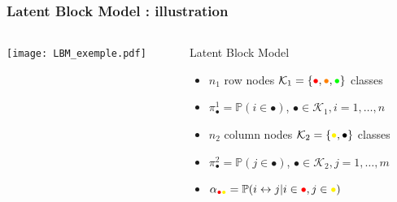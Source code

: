 \documentclass[compress,10pt]{beamer}
\begin{document}
\begin{frame}\frametitle{Latent Block Model : illustration}
 \begin{center}
    \begin{overlayarea}{\textwidth}{.5\textheight}
      \begin{columns}
        \begin{column}{.45\paperwidth}
        \centering
        \texttt{[image: LBM\_exemple.pdf]}
        \end{column}
        \begin{column}{.5\paperwidth}
          \begin{small}
            \begin{block}{Latent Block Model}
              \begin{itemize}
              \item
                $n_1$ row nodes $\mathcal{K}_1=\{\textcolor{red}{\bullet},\textcolor{orange}{\bullet},\textcolor{green}{\bullet}\}$
                classes
              \item  $\pi^1_\bullet  =  \mathbb{P}(i  \in  \bullet)$,
                $\bullet\in\mathcal{K}_1,i=1,\dots,n$
              \item $n_2$ column nodes $\mathcal{K}_2=\{\textcolor{yellow}{\bullet},\textcolor{black}{\bullet}\}$
                classes
               \item  $\pi^2_\bullet  =  \mathbb{P}(j  \in  \bullet)$,
                $\bullet\in\mathcal{K}_2,j=1,\dots,m$
              \item      $\alpha_{\textcolor{red}{\bullet}\textcolor{yellow}{\bullet}}     =      \mathbb{P}(i
                \leftrightarrow j | i\in\textcolor{red}{\bullet},j\in\textcolor{yellow}{\bullet})$
              \end{itemize}
            \end{block}
          \end{small}
        \end{column}
      \end{columns}
    \end{overlayarea}
  \end{center}
  


\end{frame}
\end{document}
